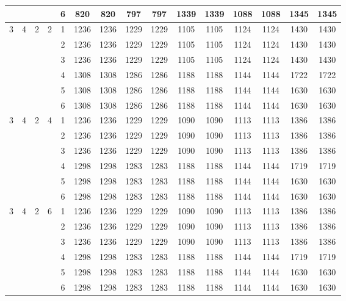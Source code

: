 \begin{longtable}{|c|c|c|c|c|c c|c c|c c|c c|c c|}
 & & & & 6 & 820 & 820 & 797 & 797 & 1339 & 1339 & 1088 & 1088 & 1345 & 1345 \\
\hline
\multirow{6}{*}{3} & \multirow{6}{*}{4} & \multirow{6}{*}{2} & \multirow{6}{*}{2} & 1 & 1236 & 1236 & 1229 & 1229 & 1105 & 1105 & 1124 & 1124 & 1430 & 1430 \\
 & & & & 2 & 1236 & 1236 & 1229 & 1229 & 1105 & 1105 & 1124 & 1124 & 1430 & 1430 \\
 & & & & 3 & 1236 & 1236 & 1229 & 1229 & 1105 & 1105 & 1124 & 1124 & 1430 & 1430 \\
 & & & & 4 & 1308 & 1308 & 1286 & 1286 & 1188 & 1188 & 1144 & 1144 & 1722 & 1722 \\
 & & & & 5 & 1308 & 1308 & 1286 & 1286 & 1188 & 1188 & 1144 & 1144 & 1630 & 1630 \\
 & & & & 6 & 1308 & 1308 & 1286 & 1286 & 1188 & 1188 & 1144 & 1144 & 1630 & 1630 \\
\hline
\multirow{6}{*}{3} & \multirow{6}{*}{4} & \multirow{6}{*}{2} & \multirow{6}{*}{4} & 1 & 1236 & 1236 & 1229 & 1229 & 1090 & 1090 & 1113 & 1113 & 1386 & 1386 \\
 & & & & 2 & 1236 & 1236 & 1229 & 1229 & 1090 & 1090 & 1113 & 1113 & 1386 & 1386 \\
 & & & & 3 & 1236 & 1236 & 1229 & 1229 & 1090 & 1090 & 1113 & 1113 & 1386 & 1386 \\
 & & & & 4 & 1298 & 1298 & 1283 & 1283 & 1188 & 1188 & 1144 & 1144 & 1719 & 1719 \\
 & & & & 5 & 1298 & 1298 & 1283 & 1283 & 1188 & 1188 & 1144 & 1144 & 1630 & 1630 \\
 & & & & 6 & 1298 & 1298 & 1283 & 1283 & 1188 & 1188 & 1144 & 1144 & 1630 & 1630 \\
\hline
\multirow{6}{*}{3} & \multirow{6}{*}{4} & \multirow{6}{*}{2} & \multirow{6}{*}{6} & 1 & 1236 & 1236 & 1229 & 1229 & 1090 & 1090 & 1113 & 1113 & 1386 & 1386 \\
 & & & & 2 & 1236 & 1236 & 1229 & 1229 & 1090 & 1090 & 1113 & 1113 & 1386 & 1386 \\
 & & & & 3 & 1236 & 1236 & 1229 & 1229 & 1090 & 1090 & 1113 & 1113 & 1386 & 1386 \\
 & & & & 4 & 1298 & 1298 & 1283 & 1283 & 1188 & 1188 & 1144 & 1144 & 1719 & 1719 \\
 & & & & 5 & 1298 & 1298 & 1283 & 1283 & 1188 & 1188 & 1144 & 1144 & 1630 & 1630 \\
 & & & & 6 & 1298 & 1298 & 1283 & 1283 & 1188 & 1188 & 1144 & 1144 & 1630 & 1630 \\
\hline

\end{longtable}

